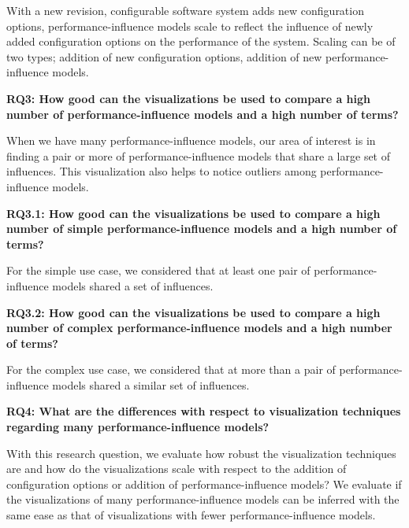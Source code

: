 With a new revision, configurable software system adds new configuration options, performance-influence models scale to reflect the influence of newly added configuration options on the performance of the system. Scaling can be of two types; addition of new configuration options, addition of new performance-influence models.   

\begin{mdframed}
\textbf{RQ3: How good can the visualizations be used to compare a high number of performance-influence models and a high number of terms?}
\end{mdframed}

When we have many performance-influence models, our area of interest is in finding a pair or more of performance-influence models that share a large set of influences. This visualization also helps to notice outliers among performance-influence models.

\begin{mdframed} 
\textbf{RQ3.1: How good can the visualizations be used to compare a high number of simple performance-influence models and a high number of terms?}
\end{mdframed}

For the simple use case, we considered that at least one pair of performance-influence models shared a set of influences. 

\begin{mdframed} 
\textbf{RQ3.2: How good can the visualizations be used to compare a high number of complex performance-influence models and a high number of terms?}
\end{mdframed}

For the complex use case, we considered that at more than a pair of performance-influence models shared a similar set of influences.

\begin{mdframed}
\textbf{RQ4: What are the differences with respect to visualization techniques regarding many performance-influence models?}
\end{mdframed}

With this research question, we evaluate how robust the visualization techniques are and how do the visualizations scale with respect to the addition of configuration options or addition of performance-influence models? We evaluate if the visualizations of many performance-influence models can be inferred with the same ease as that of visualizations with fewer performance-influence models.

